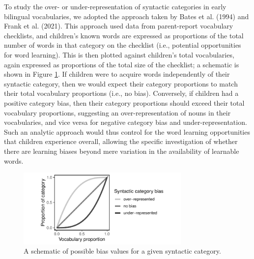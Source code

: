 \documentclass[10pt, letterpaper]{article}
\begin{document}
To study the over- or under-representation of syntactic categories in
early bilingual vocabularies, we adopted the approach taken by Bates et
al. (1994) and Frank et al. (2021). This approach used data from
parent-report vocabulary checklists, and children's known words are
expressed as proportions of the total number of words in that category
on the checklist (i.e., potential opportunities for word learning). This
is then plotted against children's total vocabularies, again expressed
as proportions of the total size of the checklist; a schematic is shown
in Figure \ref{fig:schematic}. If children were to acquire words
independently of their syntactic category, then we would expect their
category proportions to match their total vocabulary proportions (i.e.,
no bias). Conversely, if children had a positive category bias, then
their category proportions should exceed their total vocabulary
proportions, suggesting an over-representation of nouns in their
vocabularies, and vice versa for negative category bias and
under-representation. Such an analytic approach would thus control for
the word learning opportunities that children experience overall,
allowing the specific investigation of whether there are learning biases
beyond mere variation in the availability of learnable words.

\begin{CodeChunk}
\begin{figure}[t]

{\centering \includegraphics[width=240pt]{figs/schematic-1} 

}

\caption[A schematic of possible bias values for a given syntactic category]{A schematic of possible bias values for a given syntactic category.}\label{fig:schematic}
\end{figure}
\end{CodeChunk}
\end{document}
